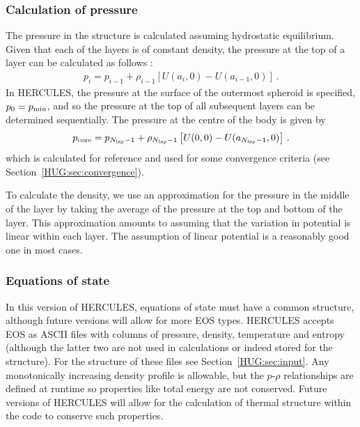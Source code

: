\documentclass[11pt, oneside]{article}   	%
\begin{document}
\subsubsection{Calculation of pressure}
\label{HUG:sec:press_calc}

The pressure in the structure is calculated assuming hydrostatic equilibrium. 
Given that each of the layers is of constant density, the pressure at the top of a layer can be calculated as follows \citep{Hubbard2013}:
%
\begin{align}
\label{HUG:eqn:press}
p_i=p_{i-1}+\rho_{i-1}\left[ U(a_i, 0) - U(a_{i-1}, 0) \right ] \,.
\end{align}
%
In HERCULES, the pressure at the surface of the outermost spheroid is specified, $p_0=p_{\rm min}$, and so the pressure at the top of all subsequent layers can be determined sequentially.
The pressure at the centre of the body is given by
%
\begin{align}
p_{\rm core}=p_{N_{\rm lay}-1}+\rho_{N_{\rm lay}-1}\left[ U(0, 0) - U(a_{N_{\rm lay}-1}, 0) \right ]\,.
\end{align}
%
which is calculated for reference and used for some convergence criteria (see Section~\ref{HUG:sec:convergence}).

To calculate the density, we use an approximation for the pressure in the middle of the layer by taking the average of the pressure at the top and bottom of the layer. 
This approximation amounts to assuming that the variation in potential is linear within each layer.
The assumption of linear potential is a reasonably good one in most cases. 

\subsubsection{Equations of state}

In this version of HERCULES, equations of state must have a common structure, although future versions will allow for more EOS types.
HERCULES accepts EOS as ASCII files with columns of pressure, density, temperature and entropy (although the latter two are not used in calculations or indeed stored for the structure).  
For the structure of these files see Section~\ref{HUG:sec:input}. Any monotonically increasing density profile is allowable, but the $p$-$\rho$ relationships are defined at runtime so properties like total energy are not conserved.
Future versions of HERCULES will allow for the calculation of thermal structure within the code to conserve such properties.
\end{document}
